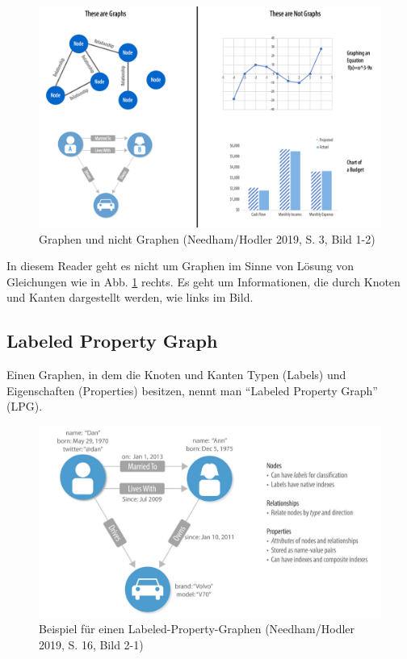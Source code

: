\documentclass[ngerman,]{scrreprt}
\begin{document}
\begin{figure}
\centering
\includegraphics{Bilder/Graph-Algorithms/02-1-2-GraphsNotGraphs.png}
\caption{Graphen und nicht Graphen (Needham/Hodler 2019, S. 3, Bild 1-2)}
\label{graphnichtgraph}
\end{figure}

In diesem Reader geht es nicht um Graphen im Sinne von Lösung von Gleichungen wie in Abb. \ref{graphnichtgraph} rechts. Es geht um Informationen, die durch Knoten und Kanten dargestellt werden, wie links im Bild.

\hypertarget{labeled-property-graph}{%
\subsection{Labeled Property Graph}\label{labeled-property-graph}}

Einen Graphen, in dem die Knoten und Kanten Typen (Labels) und Eigenschaften (Properties) besitzen, nennt man ``Labeled Property Graph'' (LPG).

\begin{figure}
\centering
\includegraphics{Bilder/Graph-Algorithms/16-2-1-LabeledPropertyGraph.png}
\caption{Beispiel für einen Labeled-Property-Graphen (Needham/Hodler 2019, S. 16, Bild 2-1)}
\label{lpg}
\end{figure}
\end{document}
